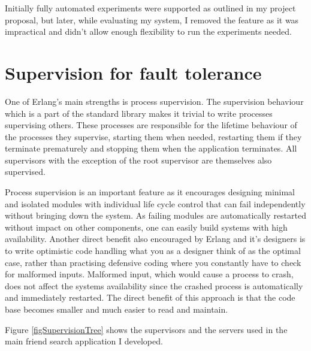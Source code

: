 Initially fully automated experiments were supported as outlined in my project proposal, but later, while evaluating my system, I removed the feature as it was impractical and didn't allow enough flexibility to run the experiments needed.

\section{Supervision for fault tolerance}
One of Erlang's main strengths is process supervision.
The supervision behaviour which is a part of the standard library makes it trivial to write processes supervising others. These processes are responsible for the lifetime behaviour of the processes they supervise, starting them when needed, restarting them if they terminate prematurely and stopping them when the application terminates. All supervisors with the exception of the root supervisor are themselves also supervised.

Process supervision is an important feature as it encourages designing minimal and isolated modules with individual life cycle control that can fail independently without bringing down the system. As failing modules are automatically restarted without impact on other components, one can easily build systems with high availability.
Another direct benefit also encouraged by Erlang and it's designers is to write optimistic code handling what you as a designer think of as the optimal case, rather than practising defensive coding where you constantly have to check for malformed inputs. Malformed input, which would cause a process to crash, does not affect the systems availability since the crashed process is automatically and immediately restarted. The direct benefit of this approach is that the code base becomes smaller and much easier to read and maintain.

Figure \ref{figSupervisionTree} shows the supervisors and the servers used in the main friend search application I developed.

